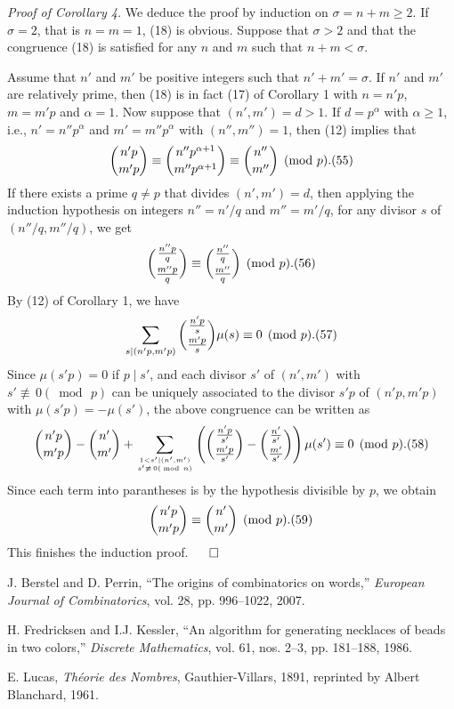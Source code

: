 \documentclass[12pt]{amsart}
\begin{document}
{{\it Proof of Corollary 4.} 
We deduce  the proof by induction on $\sigma =n+m\ge 2$. 
If $\sigma =2$, that is $n=m=1$, (18) is obvious. Suppose that 
$\sigma>2$ and that the congruence (18) is satisfied for
any $n$ and $m$ such that $n+m<\sigma$.  

Assume that $n'$ and $m'$ be positive integers
such that $n'+m'=\sigma$.
If $n'$ and $m'$ are relatively prime, then
(18) is in fact (17) of Corollary 1  with $n=n'p$, $m=m'p$ and $\alpha=1$.  
Now suppose that $(n',m')=d>1$. If $d=p^{\alpha}$ with $\alpha \ge 1$,
i.e., $n'=n''p^{\alpha}$ and $m'=m''p^{\alpha}$ with $(n'',m'')=1$,
then (12) implies that 
$$
{n'p \choose m'p}\equiv{n''p^{\alpha+1} \choose m''p^{\alpha+1}}
\equiv {n'' \choose m''}\pmod{p}.\relax(55)
$$
If there exists a prime $q\not= p$ that divides $(n',m')=d$, 
then applying the induction hypothesis on integers $n''=n'/q$ and $m''=m'/q$, 
for any divisor $s$ of $\left(n''/q,m''/q\right)$,   we get
 $$
{\frac{n''p}{q}\choose\frac{m''p}{q}}
\equiv {\frac{n''}{q}\choose\frac{m''}{q}}\pmod{p}.\relax(56)
 $$
By (12) of Corollary 1, we have 
  $$
\sum_{s|(n'p,m'p)}{\frac{n'p}{s}\choose\frac{m'p}{s}}\mu(s)\equiv 0\pmod{p}.
\relax(57)
 $$
Since $\mu (s'p)=0$ if $p\mid s'$, and  each divisor $s'$ of $(n',m')$ 
with $s'\not\equiv\, 0 {(\bmod\, p)}$ can be uniquely  associated to the divisor 
$s'p$ of $(n'p,m'p)$ with $\mu(s'p)=-\mu(s')$, the above congruence can be written 
as
   $$
{n'p \choose m'p}-{n' \choose m'}+
\sum_{1<s'|(n',m')\atop s'\not\equiv\, 0 {(\bmod\, n)}}
\left({\frac{n'p}{s'}\choose\frac{m'p}{s'}}
-{\frac{n'}{s'}\choose\frac{m'}{s'}}\right)\mu(s')\equiv 0\pmod{p}.\relax(58)
   $$
Since each term into parantheses is by the  hypothesis divisible by 
$p$, we obtain 
   $$
{n'p \choose m'p}\equiv {n' \choose m'}
\pmod{p}.\relax(59)
 $$
  This finishes the induction proof. 
\hfill$\qed$
  

\begin{thebibliography}{999}



  J. Berstel and D. Perrin, ``The origins of combinatorics 
on words,''  {\it European Journal of Combinatorics}, vol.  28,  
pp. 996--1022, 2007.

  H. Fredricksen and I.J. Kessler, ``An algorithm for generating 
necklaces of beads in two colors,'' {\it Discrete Mathematics}, vol. 61, 
nos. 2--3,  pp. 181--188, 1986.

 E. Lucas, {\it Th\'eorie des Nombres}, Gauthier-Villars, 1891,
reprinted by Albert Blanchard, 1961.


\end{thebibliography}}
\end{document}
